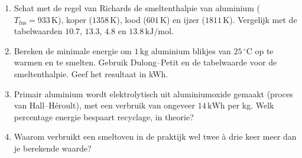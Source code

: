 \begin{oefening}
\begin{enumerate}
\item[(a)]
  Schat met de regel van Richards de smeltenthalpie van aluminium (\(T_{\text{fus}} = 933\,\mathrm{K}\)), koper (\(1358\,\mathrm{K}\)), lood (\(601\,\mathrm{K}\)) en ijzer (\(1811\,\mathrm{K}\)). Vergelijk met de tabelwaarden \(10.7\), \(13.3\), \(4.8\) en \(13.8\,\mathrm{kJ/mol}\).
\item[(b)]
  Bereken de minimale energie om \(1\,\mathrm{kg}\) aluminium blikjes van \(25\,^\circ\mathrm{C}\) op te warmen en te smelten. Gebruik Dulong--Petit en de tabelwaarde voor de smeltenthalpie. Geef het resultaat in kWh.
\item[(c)]
  Primair aluminium wordt elektrolytisch uit aluminiumoxide gemaakt (proces van Hall--Héroult), met een verbruik van ongeveer \(14\,\mathrm{kWh}\) per kg. Welk percentage energie bespaart recyclage, in theorie?
\item[(d)]
  Waarom verbruikt een smeltoven in de praktijk wel twee à drie keer meer dan je berekende waarde?
\end{enumerate}
\end{oefening}
